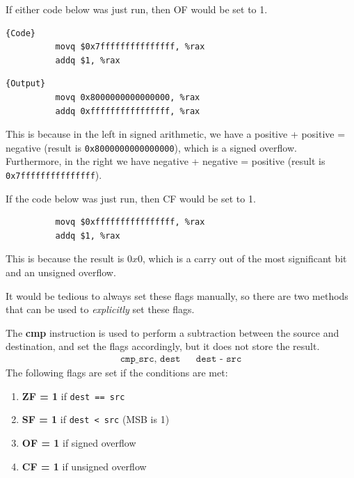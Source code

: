 \documentclass{article}
\begin{document}
      \begin{example}
        If either code below was just run, then OF would be set to 1. 

        \noindent\begin{minipage}{.5\textwidth}
        \begin{lstlisting}[]{Code}
          movq $0x7fffffffffffffff, %rax 
          addq $1, %rax
        \end{lstlisting}
        \end{minipage}
        \hfill
        \begin{minipage}{.49\textwidth}
        \begin{lstlisting}[]{Output}
          movq 0x8000000000000000, %rax 
          addq 0xffffffffffffffff, %rax
        \end{lstlisting}
        \end{minipage}
        This is because in the left in signed arithmetic, we have a positive + positive = negative (result is \texttt{0x8000000000000000}), which is a signed overflow. Furthermore, in the right we have negative + negative = positive (result is \texttt{0x7fffffffffffffff}). 
      \end{example}

      \begin{example}
        If the code below was just run, then CF would be set to 1. 
        \begin{lstlisting}
          movq $0xffffffffffffffff, %rax 
          addq $1, %rax
        \end{lstlisting}
        This is because the result is $0x0$, which is a carry out of the most significant bit and an unsigned overflow.
      \end{example}

      It would be tedious to always set these flags manually, so there are two methods that can be used to \textit{explicitly} set these flags. 

      \begin{definition}[Compare]
        The \textbf{cmp} instruction is used to perform a subtraction between the source and destination, and set the flags accordingly, but it does not store the result.
        \begin{align*}
          \texttt{cmp\_ src, dest} && \texttt{dest - src} 
        \end{align*}
        The following flags are set if the conditions are met: 
        \begin{enumerate}
          \item \textbf{ZF = 1} if \texttt{dest == src} 
          \item \textbf{SF = 1} if \texttt{dest < src} (MSB is 1) 
          \item \textbf{OF = 1} if signed overflow 
          \item \textbf{CF = 1} if unsigned overflow
        \end{enumerate}
      \end{definition}
\end{document}
